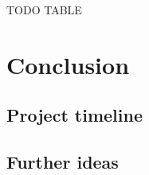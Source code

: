 \documentclass{easychair}
\begin{document}
TODO TABLE

\section{Conclusion}
\label{sect:Conclusion}

\subsection{Project timeline}


\subsection{Further ideas}




%
\label{sect:bib}

%
%
%



\end{document}
